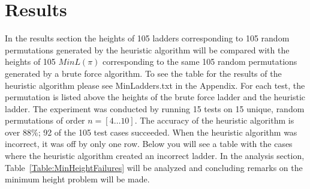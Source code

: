 \section{Results}
In the results section the heights of 105 ladders corresponding to 105 random permutations generated by the heuristic algorithm 
will be compared with the heights of 105 $MinL(\pi)$ corresponding to the same 105 random permutations generated by a brute force 
algorithm.
To see the table for the results of the heuristic algorithm please see 
MinLadders.txt in the Appendix. For each test, the permutation is listed above the heights of the brute 
force ladder and the heuristic ladder. The experiment was conducted by running 
15 tests on 15 unique, random permutations of order $n=[4 \dots 10]$.
The accuracy of the heuristic algorithm is 
over 88\%; 92 of the 105 test cases succeeded. When the heuristic algorithm was incorrect, it was off by only one row.
Below you will see a table with the cases where the heuristic algorithm created an incorrect ladder.
In the analysis section, Table~\ref{Table:MinHeightFailures} will be analyzed and concluding remarks on the 
minimum height problem will be made.

